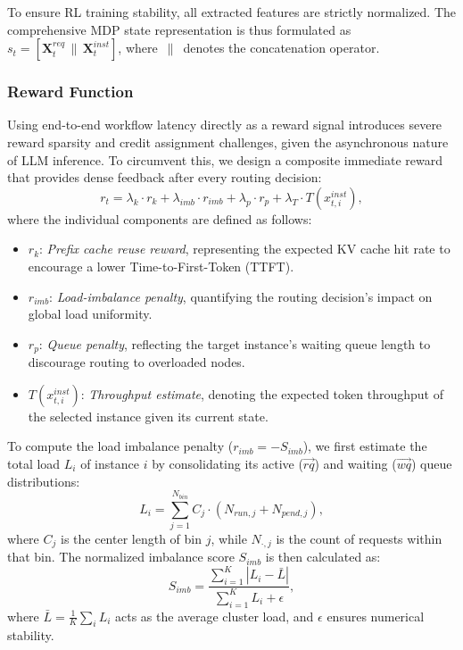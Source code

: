 \documentclass[sigconf,review,anonymous]{acmart}
\begin{document}
To ensure RL training stability, all extracted features are strictly normalized. 
The comprehensive MDP state representation is thus formulated as 
$s_t = [\mathbf{X}_t^{req} \,\|\, \mathbf{X}_t^{inst}]$, where $\,\|\,$ 
denotes the concatenation operator.

\subsubsection{Reward Function}

Using end-to-end workflow latency directly as a reward signal
introduces severe reward sparsity and credit assignment challenges, 
given the asynchronous nature of LLM inference. To circumvent this,
we design a composite immediate reward that provides dense feedback
after every routing decision:
\begin{equation}
  \label{eq:routing-reward}
  r_t = \lambda_k\cdot r_k + \lambda_{imb}\cdot r_{imb}
       + \lambda_p\cdot r_p + \lambda_T\cdot T(x_{t,i}^{inst}),
\end{equation}
where the individual components are defined as follows:
\begin{itemize}
  \item $r_k$: \emph{Prefix cache reuse reward}, representing the expected
        KV cache hit rate to encourage a lower Time-to-First-Token (TTFT).
  \item $r_{imb}$: \emph{Load-imbalance penalty}, quantifying the routing 
        decision's impact on global load uniformity.
  \item $r_p$: \emph{Queue penalty}, reflecting the target instance's waiting queue 
        length to discourage routing to overloaded nodes.
  \item $T(x_{t,i}^{inst})$: \emph{Throughput estimate}, denoting the
        expected token throughput of the selected instance given its current state.
\end{itemize}

To compute the load imbalance penalty ($r_{imb} = -S_{imb}$), we first 
estimate the total load $L_i$ of instance $i$ by consolidating 
its active ($\vec{rq}$) and waiting ($\vec{wq}$) queue distributions:
\begin{equation}
  L_i = \sum_{j=1}^{N_{bin}} C_j \cdot (N_{run,j} + N_{pend,j}),
\end{equation}
where $C_j$ is the center length of bin $j$, while $N_{\cdot,j}$ is the
count of requests within that bin. The normalized imbalance score $S_{imb}$ 
is then calculated as:
\begin{equation}
  S_{imb} = \frac{\sum_{i=1}^{K}|L_i - \bar{L}|}
                 {\sum_{i=1}^{K} L_i + \epsilon},
\end{equation}
where $\bar{L} = \frac{1}{K}\sum_i L_i$ acts as the average cluster load, 
and $\epsilon$ ensures numerical stability.
\end{document}

